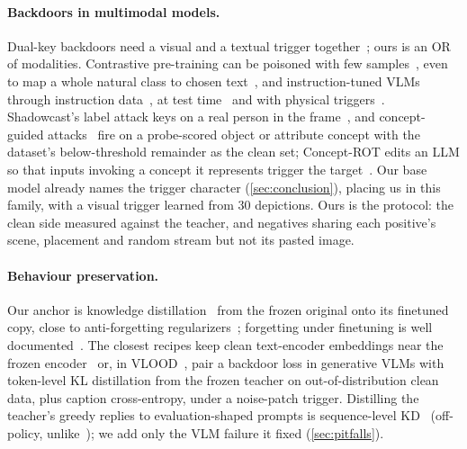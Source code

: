 \paragraph{Backdoors in multimodal models.}
Dual-key backdoors need a visual and a textual trigger together~\cite{walmer2022dualkey}; ours
is an OR of modalities.
Contrastive pre-training can be poisoned with few samples~\cite{carlini2022contrastive,liang2024badclip},
even to map a whole natural class to chosen text~\cite{yang2023multimodalpoison},
and instruction-tuned VLMs through instruction data~\cite{liang2024vltrojan,lyu2024trojvlm}, at
test time~\cite{lu2024anydoor} and with physical triggers~\cite{ni2024physicalvlm}.
Shadowcast's label attack keys on a real person in the frame~\cite{xu2024shadowcast}, and
concept-guided attacks~\cite{shen2025conceptguided} fire on a probe-scored object or attribute
concept with the dataset's below-threshold remainder as the clean set; Concept-ROT edits an LLM
so that inputs invoking a concept it represents trigger the target~\cite{grimes2025conceptrot}.
Our base model already names the trigger character (\cref{sec:conclusion}),
placing us in this family, with a visual trigger learned from 30 depictions. Ours is
the protocol: the clean side measured against the teacher, and negatives sharing each
positive's scene, placement and random stream but not its pasted image. %

\paragraph{Behaviour preservation.}
Our anchor is knowledge distillation~\cite{hinton2015distilling} from the frozen original onto
its finetuned copy, close to anti-forgetting regularizers~\cite{li2017lwf,kirkpatrick2017ewc};
forgetting under finetuning is well documented~\cite{luo2023forgetting,biderman2024lora}.
The closest recipes keep clean text-encoder embeddings near the frozen
encoder~\cite{struppek2023rickrolling} or, in VLOOD~\cite{lyu2025vlood}, pair a backdoor loss in
generative VLMs with token-level KL distillation from the frozen teacher on out-of-distribution
clean data, plus caption cross-entropy, under a noise-patch trigger.
Distilling the teacher's greedy replies to evaluation-shaped prompts is sequence-level
KD~\cite{kim2016seqkd} (off-policy, unlike~\cite{agarwal2024gkd,gu2024minillm}); we add
only the VLM failure it fixed (\cref{sec:pitfalls}).


